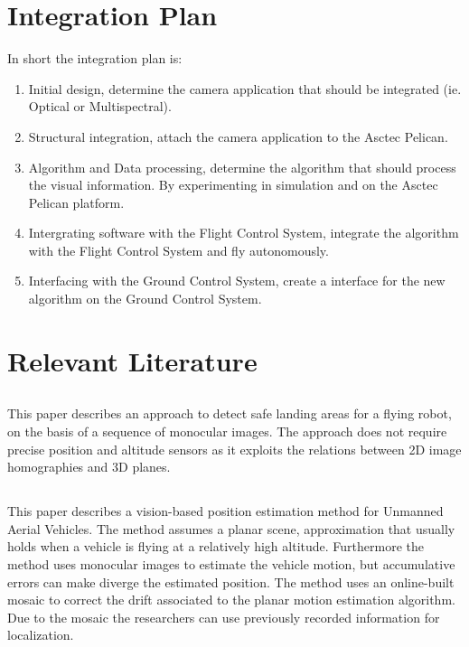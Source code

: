 \documentclass[11pt]{article}
\begin{document}
\section{Integration Plan}
In short the integration plan is:
\begin{enumerate}
\item Initial design, determine the camera application that should be integrated (ie. Optical or Multispectral).
\item Structural integration, attach the camera application to the Asctec Pelican.
\item Algorithm and Data processing, determine the algorithm that should process the visual information. By experimenting in simulation and on the Asctec Pelican platform.
\item Intergrating software with the Flight Control System, integrate the algorithm with the Flight Control System and fly autonomously.
\item Interfacing with the Ground Control System, create a interface for the new algorithm on the Ground Control System.
\end{enumerate}

\section{Relevant Literature}
\subsection{\cite{Bosch2006}}
This paper describes an approach to detect safe landing areas for a flying robot, on the basis of a sequence of monocular images. The approach does not require precise position and altitude sensors as it exploits the relations between 2D image homographies and 3D planes.
\subsection{\cite{Cabellero2009}}
This paper describes a vision-based position estimation method for Unmanned Aerial Vehicles. The method assumes a planar scene, approximation that usually holds when a vehicle is flying at a relatively high altitude. Furthermore the method uses monocular images to estimate the vehicle motion, but accumulative errors can make diverge the estimated position. The method uses an online-built mosaic to correct the drift associated to the planar motion estimation algorithm. Due to the mosaic the researchers can use previously recorded information for localization.
\end{document}
